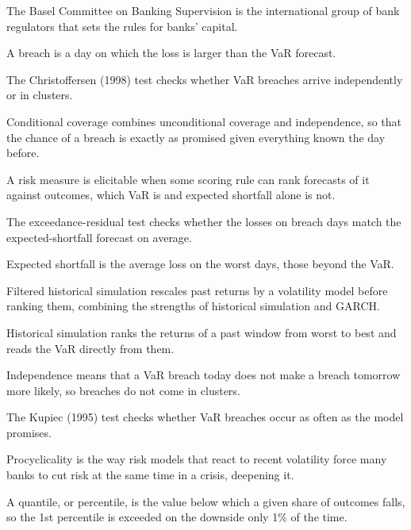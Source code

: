 \begin{keyterms}
\small
\begin{description}[leftmargin=0pt, itemsep=2pt, parsep=0pt, font=\normalfont\bfseries\color{FEMaroon}]
  \item[Basel Committee.] The Basel Committee on Banking Supervision is the international group of bank regulators that sets the rules for banks' capital.
  \item[Breach.] A breach is a day on which the loss is larger than the VaR forecast.
  \item[Christoffersen test.] The Christoffersen (1998) test checks whether VaR breaches arrive independently or in clusters.
  \item[Conditional coverage.] Conditional coverage combines unconditional coverage and independence, so that the chance of a breach is exactly as promised given everything known the day before.
  \item[Elicitable.] A risk measure is elicitable when some scoring rule can rank forecasts of it against outcomes, which VaR is and expected shortfall alone is not.
  \item[Exceedance-residual test.] The exceedance-residual test checks whether the losses on breach days match the expected-shortfall forecast on average.
  \item[Expected shortfall (ES).] Expected shortfall is the average loss on the worst days, those beyond the VaR.
  \item[Filtered historical simulation.] Filtered historical simulation rescales past returns by a volatility model before ranking them, combining the strengths of historical simulation and GARCH.
  \item[Historical simulation.] Historical simulation ranks the returns of a past window from worst to best and reads the VaR directly from them.
  \item[Independence of breaches.] Independence means that a VaR breach today does not make a breach tomorrow more likely, so breaches do not come in clusters.
  \item[Kupiec test.] The Kupiec (1995) test checks whether VaR breaches occur as often as the model promises.
  \item[Procyclicality.] Procyclicality is the way risk models that react to recent volatility force many banks to cut risk at the same time in a crisis, deepening it.
  \item[Quantile.] A quantile, or percentile, is the value below which a given share of outcomes falls, so the 1st percentile is exceeded on the downside only 1\% of the time.

\end{description}
\end{keyterms}
